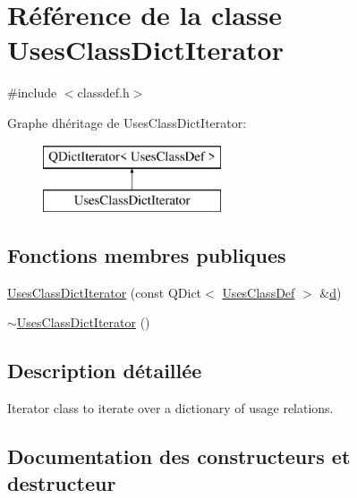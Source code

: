 \hypertarget{class_uses_class_dict_iterator}{}\section{Référence de la classe Uses\+Class\+Dict\+Iterator}
\label{class_uses_class_dict_iterator}


{\ttfamily \#include $<$classdef.\+h$>$}

Graphe d\textquotesingle{}héritage de Uses\+Class\+Dict\+Iterator\+:\begin{figure}[H]
\begin{center}
\leavevmode
\includegraphics[height=2.000000cm]{class_uses_class_dict_iterator}
\end{center}
\end{figure}
\subsection*{Fonctions membres publiques}
\begin{DoxyCompactItemize}
\item 
\hyperlink{class_uses_class_dict_iterator_a741911d63a87ad5d522ccea01ccae714}{Uses\+Class\+Dict\+Iterator} (const Q\+Dict$<$ \hyperlink{struct_uses_class_def}{Uses\+Class\+Def} $>$ \&\hyperlink{060__command__switch_8tcl_af43f4b1f0064a33b2d662af9f06d3a00}{d})
\item 
\hyperlink{class_uses_class_dict_iterator_a761c7840f2f3e77f25510d3f22087b62}{$\sim$\+Uses\+Class\+Dict\+Iterator} ()
\end{DoxyCompactItemize}


\subsection{Description détaillée}
Iterator class to iterate over a dictionary of usage relations. 

\subsection{Documentation des constructeurs et destructeur}
\hypertarget{class_uses_class_dict_iterator_a741911d63a87ad5d522ccea01ccae714}{}
